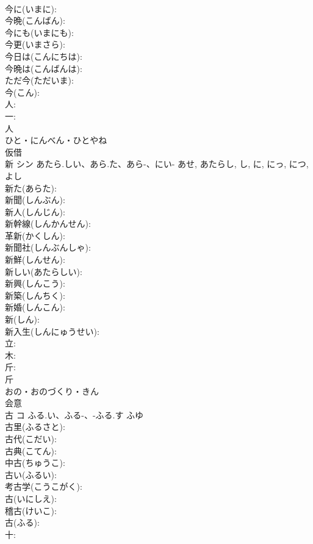 \documentclass[8pt]{extreport}
\begin{document}
\begin{CJK}{UTF8}{min}
\\	今に(いまに): 
\\	今晩(こんばん): 
\\	今にも(いまにも): 
\\	今更(いまさら): 
\\	今日は(こんにちは): 
\\	今晩は(こんばんは): 
\\	ただ今(ただいま): 
\\	今(こん): 
\\	人: 
\\	一: 
\\	人	
\\	ひと・にんべん・ひとやね	
\\	仮借 
\\	新	シン	あたら.しい、あら.た、あら-、にい-	あせ, あたらし, し, に, にっ, につ, よし	
\\	新た(あらた): 
\\	新聞(しんぶん): 
\\	新人(しんじん): 
\\	新幹線(しんかんせん): 
\\	革新(かくしん): 
\\	新聞社(しんぶんしゃ): 
\\	新鮮(しんせん): 
\\	新しい(あたらしい): 
\\	新興(しんこう): 
\\	新築(しんちく): 
\\	新婚(しんこん): 
\\	新(しん): 
\\	新入生(しんにゅうせい): 
\\	立: 
\\	木: 
\\	斤: 
\\	斤	
\\	おの・おのづくり・きん	
\\	会意 
\\	古	コ	ふる.い、ふる-、-ふる.す	ふゆ	
\\	古里(ふるさと): 
\\	古代(こだい): 
\\	古典(こてん): 
\\	中古(ちゅうこ): 
\\	古い(ふるい): 
\\	考古学(こうこがく): 
\\	古(いにしえ): 
\\	稽古(けいこ): 
\\	古(ふる): 
\\	十: 

\end{CJK}
\end{document}
